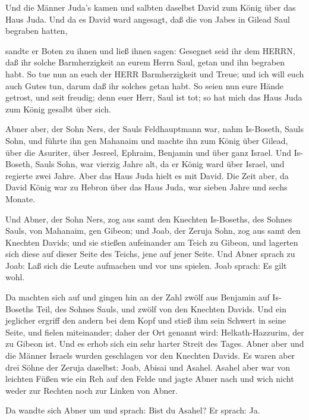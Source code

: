  Und die Männer Juda's kamen und salbten daselbst David zum
König über das Haus Juda. Und da es David ward angesagt, daß die von
Jabes in Gilead Saul begraben hatten,

 sandte er Boten zu ihnen und ließ ihnen sagen: Gesegnet
seid ihr dem HERRN, daß ihr solche Barmherzigkeit an eurem Herrn Saul,
getan und ihn begraben habt.  So tue nun an euch der HERR
Barmherzigkeit und Treue; und ich will euch auch Gutes tun, darum daß
ihr solches getan habt.  So seien nun eure Hände getrost,
und seit freudig; denn euer Herr, Saul ist tot; so hat mich das Haus
Juda zum König gesalbt über sich.

 Abner aber, der Sohn Ners, der Sauls Feldhauptmann war,
nahm Is-Boseth, Sauls Sohn, und führte ihn gen Mahanaim  und
machte ihn zum König über Gilead, über die Asuriter, über Jesreel,
Ephraim, Benjamin und über ganz Israel.  Und Is-Boseth,
Sauls Sohn, war vierzig Jahre alt, da er König ward über Israel, und
regierte zwei Jahre. Aber das Haus Juda hielt es mit David.
 Die Zeit aber, da David König war zu Hebron über das Haus
Juda, war sieben Jahre und sechs Monate.

 Und Abner, der Sohn Ners, zog aus samt den Knechten
Is-Boseths, des Sohnes Sauls, von Mahanaim, gen Gibeon; 
und Joab, der Zeruja Sohn, zog aus samt den Knechten Davids; und sie
stießen aufeinander am Teich zu Gibeon, und lagerten sich diese auf
dieser Seite des Teichs, jene auf jener Seite.  Und Abner
sprach zu Joab: Laß sich die Leute aufmachen und vor uns spielen. Joab
sprach: Es gilt wohl.

 Da machten sich auf und gingen hin an der Zahl zwölf aus
Benjamin auf Is-Boseths Teil, des Sohnes Sauls, und zwölf von den
Knechten Davids.  Und ein jeglicher ergriff den andern bei
dem Kopf und stieß ihm sein Schwert in seine Seite, und fielen
miteinander; daher der Ort genannt wird: Helkath-Hazzurim, der zu Gibeon
ist.  Und es erhob sich ein sehr harter Streit des Tages.
Abner aber und die Männer Israels wurden geschlagen vor den Knechten
Davids.  Es waren aber drei Söhne der Zeruja daselbst:
Joab, Abisai und Asahel. Asahel aber war von leichten Füßen wie ein Reh
auf den Felde  und jagte Abner nach und wich nicht weder
zur Rechten noch zur Linken von Abner.

 Da wandte sich Abner um und sprach: Bist du Asahel? Er
sprach: Ja.

